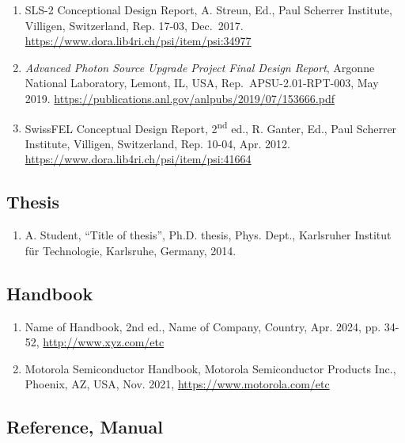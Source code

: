 \documentclass[%
               hyphens,       %
               ]{jacow}
\begin{document}
\begin{enumerate}[leftmargin=22pt, resume*]
	\item SLS-2 Conceptional Design Report, 
		A. Streun, Ed., Paul Scherrer Institute, Villigen, Switzerland, Rep. 17-03, Dec.~2017. \url{https://www.dora.lib4ri.ch/psi/item/psi:34977}

	\item \textit{Advanced Photon Source Upgrade Project Final Design Report}, 
		Argonne National Laboratory, Lemont, IL, USA, Rep.~APSU-2.01-RPT-003, May 2019. \url{https://publications.anl.gov/anlpubs/2019/07/153666.pdf} 

	\item SwissFEL Conceptual Design Report, 2\textsuperscript{nd} ed., 
		R. Ganter, Ed., Paul Scherrer Institute, Villigen, Switzerland, Rep. 10-04, Apr. 2012. \url{https://www.dora.lib4ri.ch/psi/item/psi:41664} 
		
\end{enumerate}

\subsection{Thesis}

\begin{enumerate}[leftmargin=22pt, resume*]
	\item A. Student, “Title of thesis”, Ph.D. thesis, Phys. Dept., 
		Karlsruher Institut für Technologie, Karlsruhe, Germany, 2014.
\end{enumerate}

\subsection{Handbook}

\begin{enumerate}[leftmargin=22pt, resume*]
	\item Name of Handbook, 2nd ed., Name of Company, Country, 
		Apr. 2024, pp. 34-52, \url{http://www.xyz.com/etc}

	\item Motorola Semiconductor Handbook, Motorola Semiconductor Products Inc., 
		Phoenix, AZ, USA, Nov. 2021, \url{https://www.motorola.com/etc}
\end{enumerate}

\subsection{Reference, Manual}
\end{document}
